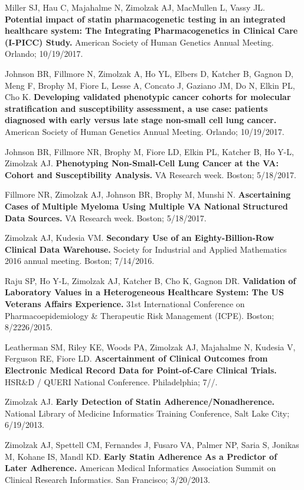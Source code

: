 \documentclass[10pt]{article}
\begin{document}
Miller SJ, Hau C, Majahalme N, Zimolzak AJ, MacMullen L, Vassy JL.
\textbf{Potential impact of statin pharmacogenetic testing in an
  integrated healthcare system: The Integrating Pharmacogenetics in
  Clinical Care (I-PICC) Study.} American Society of Human Genetics
Annual Meeting. Orlando; 10/19/2017.

Johnson BR, Fillmore N, Zimolzak A, Ho YL, Elbers D, Katcher B, Gagnon
D, Meng F, Brophy M, Fiore L, Lesse A, Concato J, Gaziano JM, Do N,
Elkin PL, Cho K. \textbf{Developing validated phenotypic cancer
  cohorts for molecular stratification and susceptibility assessment,
  a use case: patients diagnosed with early versus late stage
  non-small cell lung cancer.} American Society of Human Genetics
Annual Meeting. Orlando; 10/19/2017.

Johnson BR, Fillmore NR, Brophy M, Fiore LD, Elkin PL, Katcher B, Ho
Y-L, Zimolzak AJ. \textbf{Phenotyping Non-Small-Cell Lung Cancer at
  the VA: Cohort and Susceptibility Analysis.} VA Research week.
Boston; 5/18/2017.

Fillmore NR, Zimolzak AJ, Johnson BR, Brophy M, Munshi N.
\textbf{Ascertaining Cases of Multiple Myeloma Using Multiple VA
  National Structured Data Sources.} VA Research week. Boston;
5/18/2017.

Zimolzak AJ, Kudesia VM. \textbf{Secondary Use of an
  Eighty-Billion-Row Clinical Data Warehouse.} Society for Industrial
and Applied Mathematics 2016 annual meeting. Boston; 7/14/2016.

Raju SP, Ho Y-L, Zimolzak AJ, Katcher B, Cho K, Gagnon DR.
\textbf{Validation of Laboratory Values in a Heterogeneous Healthcare
  System: The US Veterans Affairs Experience.} 31st International
Conference on Pharmacoepidemiology \& Therapeutic Risk Management
(ICPE). Boston; 8/22\ndash{}26/2015.

Leatherman SM, Riley KE, Woods PA, Zimolzak AJ, Majahalme N, Kudesia
V, Ferguson RE, Fiore LD. \textbf{Ascertainment of Clinical Outcomes
  from Electronic Medical Record Data for Point-of-Care Clinical
  Trials.} HSR\&D / QUERI National Conference. Philadelphia;
7/\ndash{}/.

Zimolzak AJ. \textbf{Early Detection of Statin
  Adherence/Nonadherence.} National Library of Medicine Informatics
Training Conference, Salt Lake City; 6/19/2013.

Zimolzak AJ, Spettell CM, Fernandes J, Fusaro VA, Palmer NP, Saria S,
Jonikas M, Kohane IS, Mandl KD. \textbf{Early Statin Adherence As a
  Predictor of Later Adherence.} American Medical Informatics
Association Summit on Clinical Research Informatics. San Francisco;
3/20/2013.
\end{document}
